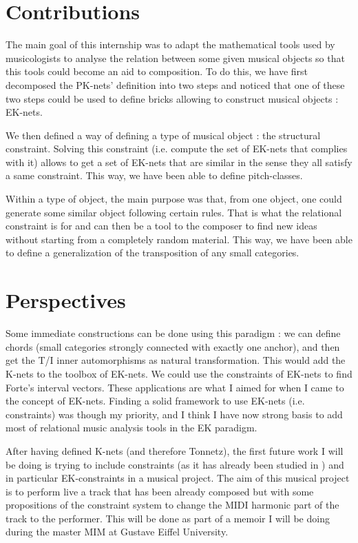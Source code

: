 \section{Contributions}
The main goal of this internship was to adapt the mathematical tools used by musicologists to analyse the relation between some given musical objects so that this tools could become an aid to composition. To do this, we have first decomposed the PK-nets' definition into two steps and noticed that one of these two steps could be used to define bricks allowing to construct musical objects : EK-nets.

We then defined a way of defining a type of musical object : the structural constraint. Solving this constraint (i.e. compute the set of EK-nets that complies with it) allows to get a set of EK-nets that are similar in the sense they all satisfy a same constraint. This way, we have been able to define pitch-classes.%

Within a type of object, the main purpose was that, from one object, one could generate some similar object following certain rules. That is what the relational constraint is for and can then be a tool to the composer to find new ideas without starting from a completely random material. This way, we have been able to define a generalization of the transposition of any small categories. %

\section{Perspectives}

Some immediate constructions can be done using this paradigm : we can define chords (small categories strongly connected with exactly one anchor), and then get the T/I inner automorphisms as natural transformation. This would add the K-nets to the toolbox of EK-nets. We could use the constraints of EK-nets to find Forte's interval vectors. These applications are what I aimed for when I came to the concept of EK-nets. Finding a solid framework to use EK-nets (i.e. constraints) was though my priority, and I think I have now strong basis to add most of relational music analysis tools in the EK paradigm.

After having defined K-nets (and therefore Tonnetz), the first future work I will be doing is trying to include constraints (as it has already been studied in \cite{talbot2017interactive}) and in particular EK-constraints in a musical project. The aim of this musical project is to perform live a track that has been already composed but with some propositions of the constraint system to change the MIDI harmonic part of the track to the performer. This will be done as part of a memoir I will be doing during the master MIM at Gustave Eiffel University.

